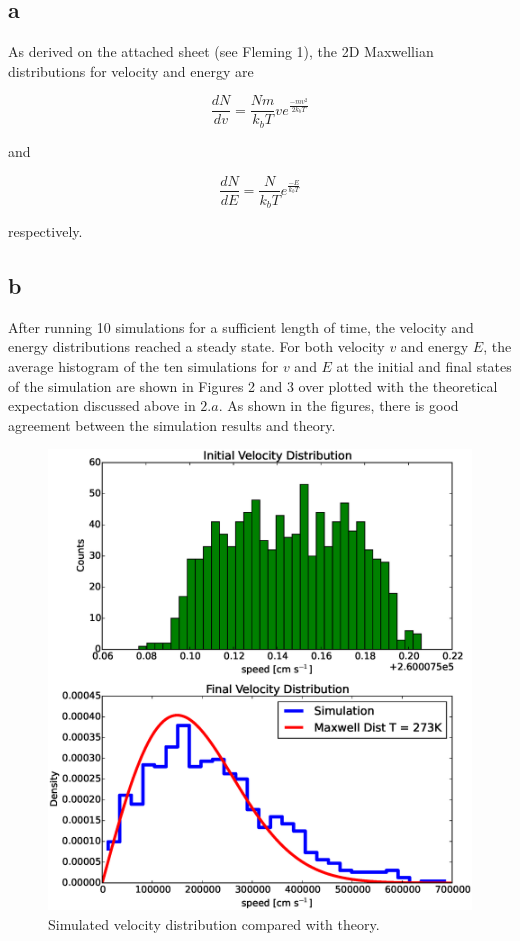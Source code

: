 \documentclass[12pt]{amsart}
\begin{document}
\subsection{a}

As derived on the attached sheet (see Fleming 1), the 2D Maxwellian distributions for velocity and energy are 

$$ \frac{dN}{dv} = \frac{N m}{k_b T} v e^{\frac{-m v^2}{2 k_b T}} $$

and

$$ \frac{dN}{dE} = \frac{N}{k_b T}  e^{\frac{-E}{k_b T}} $$

respectively.

\subsection{b}

After running 10 simulations for a sufficient length of time, the velocity and energy distributions reached a steady state.  For both velocity $v$ and energy $E$, the average histogram of the ten simulations for $v$ and $E$ at the initial and final states of the simulation are shown in Figures 2 and 3 over plotted with the theoretical expectation discussed above in $2.a$.  As shown in the figures, there is good agreement between the simulation results and theory.

\begin{figure}[h!]
  \centering
    \includegraphics[width=1.0\textwidth]{vel_dist.eps}
    \caption{Simulated velocity distribution compared with theory.}
\end{figure}
\end{document}
